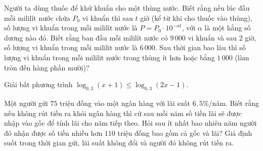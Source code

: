 \begin{bt}%
	Người ta dùng thuốc để khử khuẩn cho một thùng nước. Biết rằng nếu lúc đầu mỗi mililít nước chứa $P_{0}$ vi khuẩn thì sau $t$ giờ (kể từ khi cho thuốc vào thùng), số lượng vi khuẩn trong mỗi mililít nước là $P=P_0 \cdot 10^{-\alpha t}$, với $\alpha$ là một hằng số dương nào đó. Biết rằng ban đầu mỗi mililít nước có $9\,000$ vi khuẩn và sau $2$ giờ, số lượng vi khuẩn trong mỗi mililit nước là $6\,000$. Sau thời gian bao lâu thì số lượng vi khuẩn trong mỗi mililit nước trong thùng ít hơn hoặc bằng $1\,000$ (làm tròn đến hàng phần mười)?
\end{bt}

\begin{bt}%
	Giải bất phương trình $\log_{0{,}3}{(x+1)}\leq\log_{0{,}3}{(2x-1)}$.
\end{bt}

\begin{bt}%

	Một người gửi $75$ triệu đồng vào một ngân hàng với lãi suất $6{,}5$\%/năm. Biết rằng nếu không rút tiền ra khỏi ngân hàng thì cứ sau mỗi năm số tiền lãi sẽ được nhập vào gốc để tính lãi cho năm tiếp theo. Hỏi sau ít nhất bao nhiêu năm người đó nhận được số tiền nhiều hơn $110$ triệu đồng bao gồm cả gốc và lãi? Giả định suốt trong thời gian gửi, lãi suất không đổi và người đó không rút tiền ra.
	
\end{bt}


